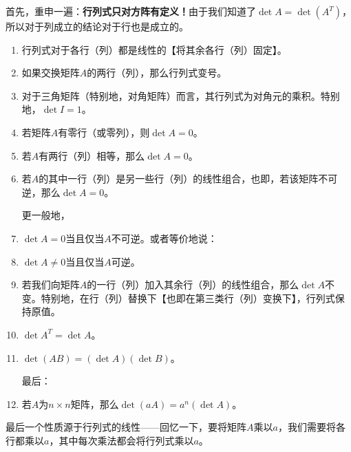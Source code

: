 首先，重申一遍：{\bf 行列式只对方阵有定义！}由于我们知道了$\det A = \det (A^T)$，所以对于列成立的结论对于行也是成立的。
\begin{enumerate}
  \item 行列式对于各行（列）都是线性的【将其余各行（列）固定】。
  \item 如果交换矩阵$A$的两行（列），那么行列式变号。
  \item 对于三角矩阵（特别地，对角矩阵）而言，其行列式为对角元的乘积。特别地，$\det I = 1$。
  \item 若矩阵$A$有零行（或零列），则$\det A = 0$。
  \item 若$A$有两行（列）相等，那么$\det A = 0$。
  \item 若$A$的其中一行（列）是另一些行（列）的线性组合，也即，若该矩阵不可逆，那么$\det A = 0$。
  
  更一般地，
  \item $\det A = 0$当且仅当$A$不可逆。或者等价地说：
  \item $\det A \neq 0$当且仅当$A$可逆。
  \item 若我们向矩阵$A$的一行（列）加入其余行（列）的线性组合，那么$\det A$不变。特别地，在行（列）替换下【也即在第三类行（列）变换下】，行列式保持原值。
  \item $\det A^T = \det A$。
  \item $\det (AB) = (\det A)(\det B)$。
  
  最后：
  \item 若$A$为$n\times n$矩阵，那么$\det (aA) = a^n(\det A)$。
\end{enumerate}

最后一个性质源于行列式的线性——回忆一下，要将矩阵$A$乘以$a$，我们需要将各行都乘以$a$，其中每次乘法都会将行列式乘以$a$。


